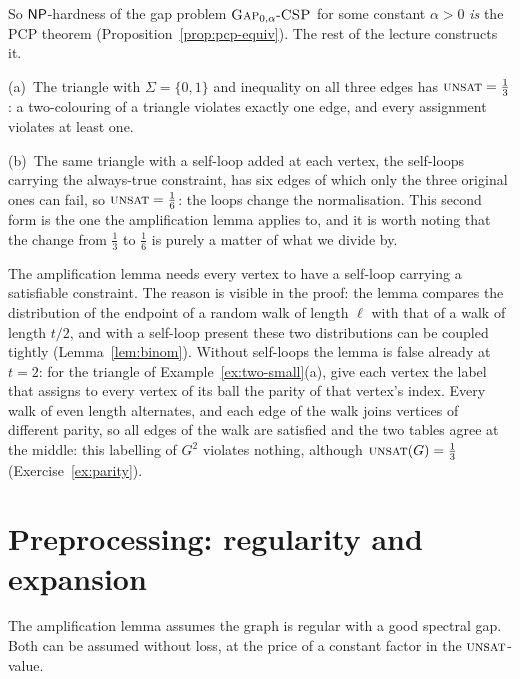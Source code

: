 \noindent
So $\mathsf{NP}$-hardness of the gap problem $\textsc{Gap}_{0,\alpha}\text{-}\textsc{\textsc{CSP}}$ for some constant $\alpha>0$ \emph{is} the PCP theorem (Proposition~\ref{prop:pcp-equiv}).  The rest of the lecture constructs it.

\begin{example}\label{ex:two-small}
(a)~The triangle with $\Sigma=\{0,1\}$ and inequality on all three edges has $\textsc{unsat}=\frac13$: a two-colouring of a triangle violates exactly one edge, and every assignment violates at least one.

(b)~The same triangle with a self-loop added at each vertex, the self-loops carrying the always-true constraint, has six edges of which only the three original ones can fail, so $\textsc{unsat}=\frac16$: the loops change the normalisation.
This second form is the one the amplification lemma applies to, and it is worth noting that the change from $\frac13$ to $\frac16$ is purely a matter of what we divide by.
\end{example}

\begin{remark}\label{rem:loops}
The amplification lemma needs every vertex to have a self-loop carrying a satisfiable constraint.  The reason is visible in the proof: the lemma compares the distribution of the endpoint of a random walk of length $\ell$ with that of a walk of length $t/2$, and with a self-loop present these two distributions can be coupled tightly (Lemma~\ref{lem:binom}).  Without self-loops the lemma is false already at $t=2$: for the triangle of Example~\ref{ex:two-small}(a), give each vertex the label that assigns to every vertex of its ball the parity of that vertex's index.  Every walk of even length alternates, and each edge of the walk joins vertices of different parity, so all edges of the walk are satisfied and the two tables agree at the middle: this labelling of $G^2$ violates nothing, although $\textsc{unsat}(G)=\frac13$ (Exercise~\ref{ex:parity}).
\end{remark}


\section{Preprocessing: regularity and expansion}
\label{sec:prep}

The amplification lemma assumes the graph is regular with a good spectral gap.  Both can be assumed without loss, at the price of a constant factor in the $\textsc{unsat}$-value.

